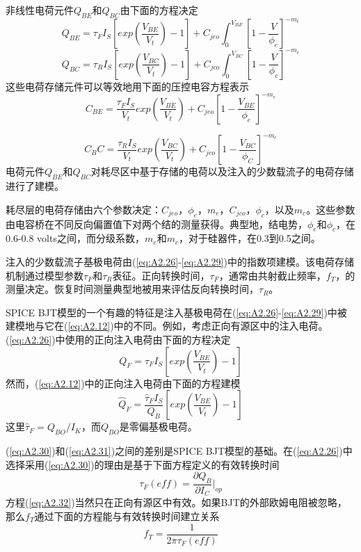 非线性电荷元件$Q_{BE}$和$Q_{BC}$由下面的方程决定
\begin{equation}
    Q_{BE} = \tau_FI_S[exp(\frac{V_{BE}}{V_t})-1]+C_{jeo}\int^{V_{BE}}_0[1-\frac{V}{\phi_e}]^{-m_e}
    \label{eq:A2.26}
\end{equation}
\begin{equation}
    Q_{BC} = \tau_RI_S[exp(\frac{V_{BC}}{V_t})-1]+C_{jco}\int^{V_{BC}}_0[1-\frac{V}{\phi_c}]^{-m_c}
    \label{eq:A2.27}
\end{equation}
这些电荷存储元件可以等效地用下面的压控电容方程表示
\begin{equation}
    C_{BE} = \frac{\tau_FI_S}{V_t}exp(\frac{V_{BE}}{V_t}) + C_{jeo}[1-\frac{V_{BE}}{\phi_e}]^{-m_e}
    \label{eq:A2.28}
\end{equation}

\begin{equation}
    C_BC = \frac{\tau_RI_S}{V_t}exp(\frac{V_{BC}}{V_t}) + C_{jco}[1-\frac{V_{BC}}{\phi_C}]^{-m_c}
    \label{eq:A2.29}
\end{equation}
电荷元件$Q_{BE}$和$Q_{BC}$对耗尽区中基于存储的电荷以及注入的少数载流子的电荷存储进行了建模。

耗尽层的电荷存储由六个参数决定：$C_{jeo}$，$\phi_e$，$m_e$，$C_{jco}$，$\phi_c$，以及$m_c$。这些参数由电容桥在不同反向偏置值下对两个结的测量获得。典型地，结电势，$\phi_e$和$\phi_c$，在0.6-0.8 volts之间，而分级系数，$m_e$和$m_c$，对于硅器件，在0.3到0.5之间。

注入的少数载流子基极电荷由(\ref{eq:A2.26}-\ref{eq:A2.29})中的指数项建模。该电荷存储机制通过模型参数$\tau_F$和$\tau_R$表征。正向转换时间，$\tau_F$，通常由共射截止频率，$f_T$，的测量决定。恢复时间测量典型地被用来评估反向转换时间，$\tau_R$。

SPICE BJT模型的一个有趣的特征是注入基极电荷在(\ref{eq:A2.26}-\ref{eq:A2.29})中被建模地与它在(\ref{eq:A2.12})中的不同。例如，考虑正向有源区中的注入电荷。(\ref{eq:A2.26})中使用的正向注入电荷由下面的方程决定
\begin{equation}
    Q_F = \tau_FI_S[exp(\frac{V_{BE}}{V_t})-1]
    \label{eq:A2.30}
\end{equation}
然而，(\ref{eq:A2.12})中的正向注入电荷由下面的方程建模
\begin{equation}
    \hat{Q}_F = \frac{\hat{\tau}_FI_S}{Q_B}[exp(\frac{V_{BE}}{V_t})-1]
    \label{eq:A2.31}
\end{equation}
这里$\hat{\tau}_F = Q_{BO}/I_K$，而$Q_{BO}$是零偏基极电荷。

(\ref{eq:A2.30})和(\ref{eq:A2.31})之间的差别是SPICE BJT模型的基础。在(\ref{eq:A2.26})中选择采用(\ref{eq:A2.30})的理由是基于下面方程定义的有效转换时间
\begin{equation}
    \tau_F(eff) = \frac{\partial Q_B}{\partial I_C}|_{op}
    \label{eq:A2.32}
\end{equation}
方程(\ref{eq:A2.32})当然只在正向有源区中有效。如果BJT的外部欧姆电阻被忽略，那么$f_T$通过下面的方程能与有效转换时间建立关系
\begin{equation}
    f_T = \frac{1}{2\pi \tau_F(eff)}
    \label{eq:A2.33}
\end{equation}

